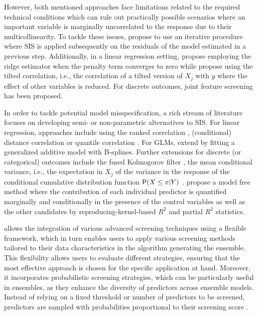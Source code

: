 \documentclass[
  article]{jss}
\begin{document}
However, both mentioned approaches face limitations related to the
required technical conditions which can rule out practically possible
scenarios where an important variable is marginally uncorrelated to the
response due to their multicollinearity. To tackle these issues,
\citet{fan2009ultrahigh} propose to use an iterative procedure where SIS
is applied subsequently on the residuals of the model estimated in a
previous step. Additionally, in a linear regression setting,
\citet{Wang2015HOLP} propose employing the ridge estimator when the
penalty term converges to zero while \citet{cho2012high} propose using
the tilted correlation, i.e., the correlation of a tilted version of
\(X_j\) with \(y\) where the effect of other variables is reduced. For
discrete outcomes, joint feature screening \citep{SMLE2014} has been
proposed.

In order to tackle potential model misspecification, a rich stream of
literature focuses on developing semi- or non-parametric alternatives to
SIS. For linear regression, approaches include using the ranked
correlation \citep{zhu2011model}, (conditional) distance correlation
\citep{li2012feature, wang2015conditional} or quantile correlation
\citep{ma2016robust}. For GLMs, \citet{fan2011nonparametric} extend
\citet{Fan2010sisglms} by fitting a generalized additive model with
B-splines. Further extensions for discrete (or categorical) outcomes
include the fused Kolmogorov filter \citep{mai2013kolmogorov}, the mean
conditional variance, i.e., the expectation in \(X_j\) of the variance
in the response of the conditional cumulative distribution function
\(\mathsf{P}(X\leq x|Y)\) \citep{cui2015model}. \citet{ke2023sufficient}
propose a model free method where the contribution of each individual
predictor is quantified marginally and conditionally in the presence of
the control variables as well as the other candidates by
reproducing-kernel-based \(R^2\) and partial \(R^2\) statistics.

 allows the integration of various advanced screening
techniques using a flexible framework, which in turn enables users to
apply various screening methods tailored to their data characteristics
in the algorithm generating the ensemble. This flexibility allows users
to evaluate different strategies, ensuring that the most effective
approach is chosen for the specific application at hand. Moreover, it
incorporates probabilistic screening strategies, which can be
particularly useful in ensembles, as they enhance the diversity of
predictors across ensemble models. Instead of relying on a fixed
threshold or number of predictors to be screened, predictors are sampled
with probabilities proportional to their screening score
\citep[see][]{Dunson2020TargRandProj, parzer2024glms}.
\end{document}

